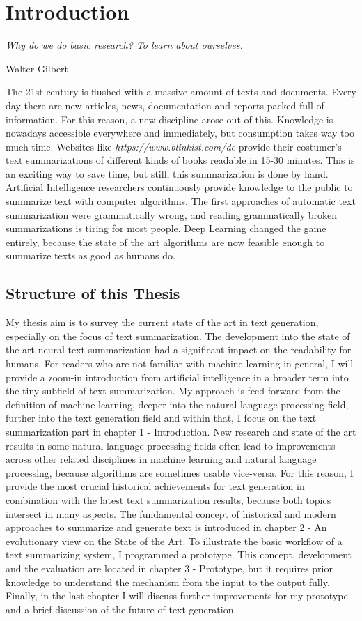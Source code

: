 \chapter{Introduction}\label{ch:intro}

\epigraph{\textit{Why do we do basic research? To learn about ourselves.}}{Walter Gilbert}

The 21st century is flushed with a massive amount of texts and documents. Every day there are new articles, news, documentation and reports packed full of information. For this reason, a new discipline arose out of this. Knowledge is nowadays accessible everywhere and immediately, but consumption takes way too much time. Websites like \textit{https://www.blinkist.com/de} provide their costumer's text summarizations of different kinds of books readable in 15-30 minutes. This is an exciting way to save time, but still, this summarization is done by hand. Artificial Intelligence researchers continuously provide knowledge to the public to summarize text with computer algorithms. The first approaches of automatic text summarization were grammatically wrong, and reading grammatically broken summarizations is tiring for most people. Deep Learning changed the game entirely, because the state of the art algorithms are now feasible enough to summarize texts as good as humans do.

\section{Structure of this Thesis}
My thesis aim is to survey the current state of the art in text generation, especially on the focus of text summarization. The development into the state of the art neural text summarization had a significant impact on the readability for humans. For readers who are not familiar with machine learning in general, I will provide a zoom-in introduction from artificial intelligence in a broader term into the tiny subfield of text summarization. My approach is feed-forward from the definition of machine learning, deeper into the natural language processing field, further into the text generation field and within that, I focus on the text summarization part in chapter 1 - Introduction. New research and state of the art results in some natural language processing fields often lead to improvements across other related disciplines in machine learning and natural language processing, because algorithms are sometimes usable vice-versa. For this reason, I provide the most crucial historical achievements for text generation in combination with the latest text summarization results, because both topics intersect in many aspects. The fundamental concept of historical and modern approaches to summarize and generate text is introduced in chapter 2 - An evolutionary view on the State of the Art. 
To illustrate the basic workflow of a text summarizing system, I programmed a prototype. This concept, development and the evaluation  are located in chapter 3 - Prototype, but it requires prior knowledge to understand the mechanism from the input to the output fully. Finally, in the last chapter I will discuss further improvements for my prototype and a brief discussion of the future of text generation.

